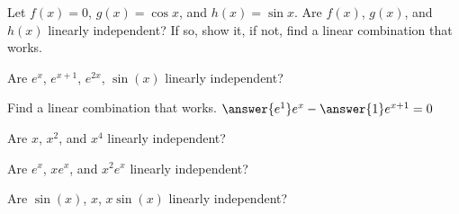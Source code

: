 \documentclass{ximera}
\begin{document}
\begin{exercise}
    Let $f(x) = 0$, $g(x) = \cos x$, and $h(x) = \sin x$. Are $f(x)$, $g(x)$, and $h(x)$ linearly independent?  If so, show it, if not, find a linear combination that works. 
    \begin{multipleChoice}
    \end{multipleChoice}
\end{exercise}

\begin{exercise}%
    Are $e^{x}$, $e^{x+1}$, $e^{2x}$, $\sin(x)$ linearly independent? 
    \begin{multipleChoice}
    \end{multipleChoice}
    \begin{problem}
        Find a linear combination that works. $\answer{e^1} e^x -  \answer{1}e^{x+1} = 0$
    \end{problem}
\end{exercise}

\begin{exercise}
    Are $x$, $x^2$, and $x^4$ linearly independent?
    \begin{multipleChoice}
    \end{multipleChoice}
\end{exercise}

\begin{exercise}
    Are $e^x$, $xe^x$, and $x^2e^x$ linearly independent?%
    \begin{multipleChoice}
    \end{multipleChoice}
\end{exercise}

\begin{exercise}%
    Are $\sin(x)$, $x$, $x\sin(x)$ linearly independent?%
    \begin{multipleChoice}
    \end{multipleChoice}
\end{exercise}
\end{document}
